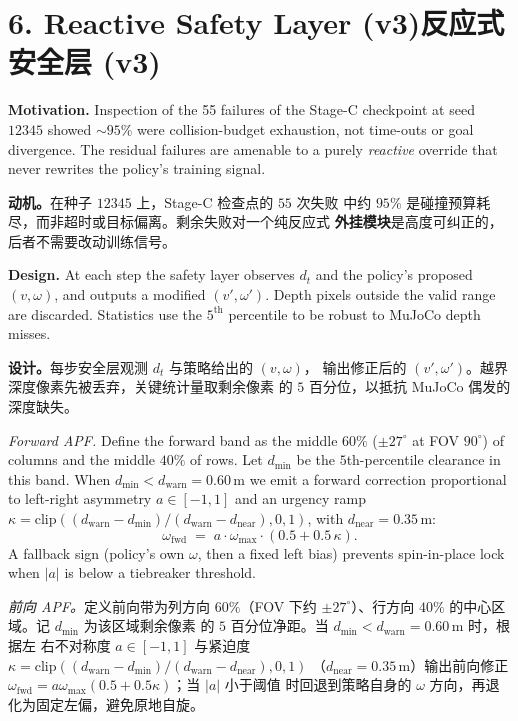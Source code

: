 \documentclass[11pt,a4paper]{article}
\newcommand{\en}[1]{\par\noindent #1\par\vspace{0.15em}}
\newcommand{\zh}[1]{\par\noindent\color{zhcol}\hspace{0.5em}#1\par\color{black}\vspace{0.6em}}
\newcommand{\bisec}[2]{\section[#1]{#1\quad\normalfont\small\color{zhcol}\textsf{#2}}}
\begin{document}
\bisec{6. Reactive Safety Layer (v3)}{反应式安全层 (v3)}

\en{\textbf{Motivation.} Inspection of the 55 failures of the Stage-C
checkpoint at seed $12345$ showed $\sim 95\%$ were collision-budget
exhaustion, not time-outs or goal divergence. The residual failures are
amenable to a purely \emph{reactive} override that never rewrites the
policy's training signal.}

\zh{\textsf{\textbf{动机。}在种子 $12345$ 上，Stage-C 检查点的 $55$ 次失败
中约 $95\%$ 是碰撞预算耗尽，而非超时或目标偏离。剩余失败对一个纯反应式
\textbf{外挂模块}是高度可纠正的，后者不需要改动训练信号。}}

\en{\textbf{Design.} At each step the safety layer observes $d_t$ and the
policy's proposed $(v,\omega)$, and outputs a modified $(v', \omega')$.
Depth pixels outside the valid range are discarded. Statistics use the
$5^{\mathrm{th}}$ percentile to be robust to MuJoCo depth misses.}

\zh{\textsf{\textbf{设计。}每步安全层观测 $d_t$ 与策略给出的 $(v,\omega)$，
输出修正后的 $(v',\omega')$。越界深度像素先被丢弃，关键统计量取剩余像素
的 $5$ 百分位，以抵抗 MuJoCo 偶发的深度缺失。}}

\en{\emph{Forward APF.} Define the forward band as the middle
$60\%$ ($\pm 27^\circ$ at FOV $90^\circ$) of columns and the middle
$40\%$ of rows. Let $d_{\min}$ be the $5$th-percentile clearance in this
band. When $d_{\min} < d_{\mathrm{warn}} = 0.60\,$m we emit a forward
correction proportional to left-right asymmetry $a \in [-1,1]$ and an
urgency ramp $\kappa = \mathrm{clip}((d_{\mathrm{warn}}-d_{\min})/(d_{\mathrm{warn}}-d_{\mathrm{near}}),0,1)$,
with $d_{\mathrm{near}} = 0.35\,$m:
\begin{equation}
  \omega_{\mathrm{fwd}} \;=\; a\cdot \omega_{\max}\cdot(0.5 + 0.5\,\kappa).
\end{equation}
A fallback sign (policy's own $\omega$, then a fixed left bias) prevents
spin-in-place lock when $|a|$ is below a tiebreaker threshold.}

\zh{\textsf{\emph{前向 APF。}定义前向带为列方向 $60\%$（FOV 下约
$\pm 27^\circ$）、行方向 $40\%$ 的中心区域。记 $d_{\min}$ 为该区域剩余像素
的 $5$ 百分位净距。当 $d_{\min} < d_{\mathrm{warn}} = 0.60\,$m 时，根据左
右不对称度 $a \in [-1,1]$ 与紧迫度
$\kappa = \mathrm{clip}((d_{\mathrm{warn}}-d_{\min})/(d_{\mathrm{warn}}-d_{\mathrm{near}}),0,1)$
（$d_{\mathrm{near}}=0.35\,$m）输出前向修正
$\omega_{\mathrm{fwd}} = a\omega_{\max}(0.5+0.5\kappa)$；当 $|a|$ 小于阈值
时回退到策略自身的 $\omega$ 方向，再退化为固定左偏，避免原地自旋。}}
\end{document}
